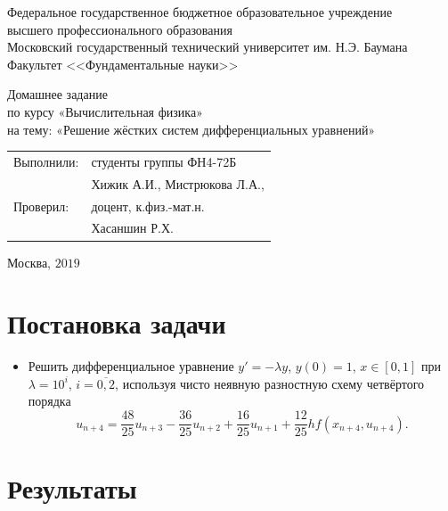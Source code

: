 \documentclass[
11pt,
master, %
subf, %
href, %
colorlinks=true, %
times, %
]{disser}
\begin{document}
	
\pagestyle{empty}
\begin{center}
	
	\noindent  Федеральное государственное бюджетное образовательное учреждение\\
	высшего профессионального образования\\
	
	Московский государственный технический университет им. Н.Э. Баумана \\
	Факультет <<Фундаментальные науки>>\bigskip\\
	
	\vfill
	
	Домашнее задание\\
	по курсу «Вычислительная физика»\\
	на тему: «Решение жёстких систем дифференциальных уравнений»\\
	
	
	\vfill
	\vfill
	\begin{flushright}
		\begin{tabular}{ll}
			Выполнили: & студенты группы ФН4-72Б     \\
			& Хижик А.И., Мистрюкова Л.А.,  \\
			Проверил:  & доцент, к.физ.-мат.н.       \\
			& Хасаншин Р.Х.
		\end{tabular}
	\end{flushright}
	\vfill
	\begin{center}
		Москва, $2019$
	\end{center}
	
\end{center}
\pagebreak


\pagestyle{plain}
\tableofcontents

\section{Постановка задачи}
\begin{itemize}
  \item Решить дифференциальное уравнение $y' = -\lambda y$, $y(0) = 1$, $x \in [0,1]$ при $\lambda = 10^i$, $i = \overline{0,2}$, используя чисто неявную разностную схему четвёртого порядка
      $$u_{n+4} = \frac{48}{25}u_{n+3} - \frac{36}{25}u_{n+2} + \frac{16}{25}u_{n+1} + \frac{12}{25}hf(x_{n+4},u_{n+4}).$$
\end{itemize}

\newpage
\section{Результаты}
\end{document}
